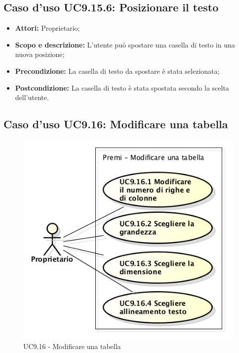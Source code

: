\subsection{Caso d'uso UC9.15.6: Posizionare il testo}
\begin{itemize}
	\item \textbf{Attori:} Proprietario;
	\item \textbf{Scopo e descrizione:} L'utente può spostare una casella di testo in una nuova posizione;
	\item \textbf{Precondizione:} La casella di testo da spostare è stata selezionata;
	\item \textbf{Postcondizione:} La casella di testo è stata spostata secondo la scelta dell'utente.
\end{itemize}

\subsection{Caso d'uso UC9.16: Modificare una tabella}
\begin{figure}[h] 
	\centering 
	\includegraphics[scale=0.45] {img/UC9.16.png} 
	\caption{UC9.16 - Modificare una tabella} 
\end{figure}


